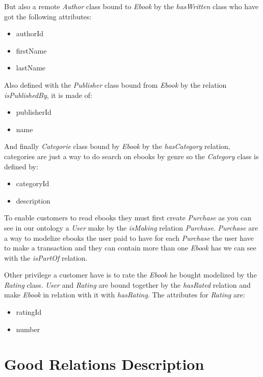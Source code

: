 \documentclass[a4paper,11pt]{article}
\begin{document}
But also a remote \emph{Author} class bound to \emph{Ebook} by the \emph{hasWritten} class who have got the
following attributes:

\begin{itemize}
  \item authorId
  \item firstName
  \item lastName
\end{itemize}

Also defined with the \emph{Publisher} class bound from \emph{Ebook} by the relation \emph{isPublishedBy},
it is made of:

\begin{itemize}
  \item publisherId
  \item name
\end{itemize}

And finally \emph{Categorie} class bound by \emph{Ebook} by the \emph{hasCategory} relation, categories are just
a way to do search on ebooks by genre so the \emph{Category} class is defined by:

\begin{itemize}
  \item categoryId
  \item description
\end{itemize}

To enable customers to read ebooks they must first create \emph{Purchase} as you can see in our ontology a \emph{User}
make by the \emph{isMaking} relation \emph{Purchase}. \emph{Purchase} are a way to modelize ebooks the user paid to have
for each \emph{Purchase} the user have to make a transaction and they can contain more than one \emph{Ebook} has we can
see with the \emph{isPartOf} relation.

Other privilege a customer have is to rate the \emph{Ebook} he bought modelized by the \emph{Rating} class.
\emph{User} and \emph{Rating} are bound together by the \emph{hasRated} relation and make \emph{Ebook} in relation
with it with \emph{hasRating}. The attributes for \emph{Rating} are:

\begin{itemize}
  \item ratingId
  \item number
\end{itemize}

\section{Good Relations Description}
\end{document}
